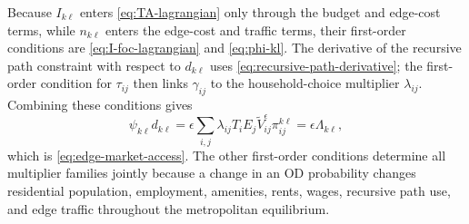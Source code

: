 \documentclass[12pt, a4paper]{article}
\theoremstyle{definition}
\theoremstyle{remark}
\begin{document}
Because $I_{k\ell}$ enters \eqref{eq:TA-lagrangian} only through the budget and edge-cost terms, while $n_{k\ell}$ enters the edge-cost and traffic terms, their first-order conditions are \eqref{eq:I-foc-lagrangian} and \eqref{eq:phi-kl}. The derivative of the recursive path constraint with respect to $d_{k\ell}$ uses \eqref{eq:recursive-path-derivative}; the first-order condition for $\tau_{ij}$ then links $\gamma_{ij}$ to the household-choice multiplier $\lambda_{ij}$. Combining these conditions gives
\[
\psi_{k\ell}d_{k\ell}
=
\epsilon
\sum_{i,j}
\lambda_{ij}T_iE_j\tilde V_{ij}^{\epsilon}
\pi_{ij}^{k\ell}
=
\epsilon\Lambda_{k\ell},
\]
which is \eqref{eq:edge-market-access}. The other first-order conditions determine all multiplier families jointly because a change in an OD probability changes residential population, employment, amenities, rents, wages, recursive path use, and edge traffic throughout the metropolitan equilibrium.


\printbibliography
\end{document}
